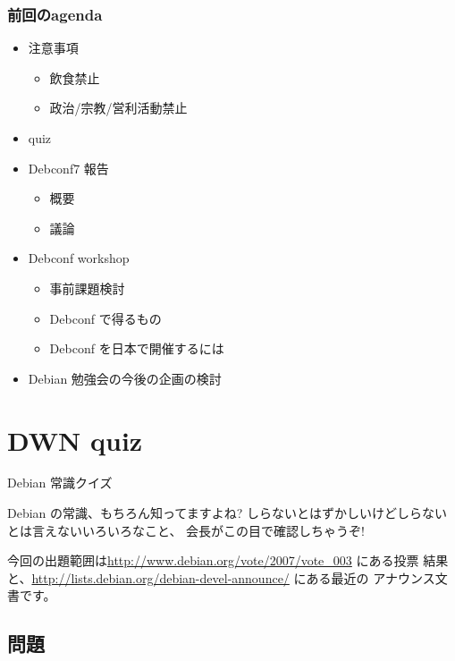 \documentclass[cjk,dvipdfmx,12pt]{beamer}
\begin{document}
\begin{frame}
 \frametitle{前回のagenda}
\begin{minipage}[t]{0.45\hsize}
  \begin{itemize}
  \item 注意事項　
	\begin{itemize}
	 \item 飲食禁止
	 \item 政治/宗教/営利活動禁止
	\end{itemize}
  \item quiz
  \item Debconf7 報告
	\begin{itemize}
	 \item 概要
	 \item 議論
	\end{itemize}
 \end{itemize}
\end{minipage} 
\begin{minipage}[t]{0.45\hsize}
 \begin{itemize}
  \item Debconf workshop
	\begin{itemize}
	 \item 事前課題検討
	 \item Debconf で得るもの
	 \item Debconf を日本で開催するには
	\end{itemize}  
\item Debian 勉強会の今後の企画の検討
 \end{itemize}
\end{minipage}
\end{frame}

\section{DWN quiz}
\begin{frame}{Debian 常識クイズ}

Debian の常識、もちろん知ってますよね?
しらないとはずかしいけどしらないとは言えないいろいろなこと、
会長がこの目で確認しちゃうぞ!


今回の出題範囲は\url{http://www.debian.org/vote/2007/vote_003} にある投票
結果と、\url{http://lists.debian.org/debian-devel-announce/} にある最近の
アナウンス文書です。
\end{frame}

\subsection{問題}
\end{document}
